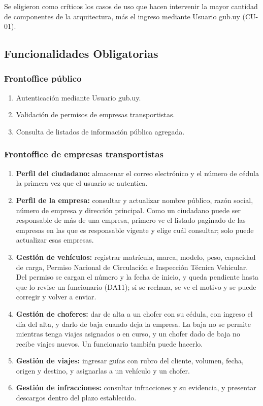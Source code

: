 Se eligieron como críticos los casos de uso que hacen intervenir la mayor cantidad de componentes de la arquitectura, más el ingreso mediante Usuario gub.uy (CU-01).

\FloatBarrier

\subsection{Funcionalidades Obligatorias}

\subsubsection{Frontoffice público}

\begin{enumerate}
    \item Autenticación mediante Usuario gub.uy.
    \item Validación de permisos de empresas transportistas.
    \item Consulta de listados de información pública agregada.
\end{enumerate}

\subsubsection{Frontoffice de empresas transportistas}

\begin{enumerate}
    \item \textbf{Perfil del ciudadano:} almacenar el correo electrónico y el número de cédula la primera vez que el usuario se autentica.
    \item \textbf{Perfil de la empresa:} consultar y actualizar nombre público, razón social, número de empresa y dirección principal. Como un ciudadano puede ser responsable de más de una empresa, primero ve el listado paginado de las empresas en las que es responsable vigente y elige cuál consultar; solo puede actualizar esas empresas.
    \item \textbf{Gestión de vehículos:} registrar matrícula, marca, modelo, peso, capacidad de carga, Permiso Nacional de Circulación e Inspección Técnica Vehicular. Del permiso se cargan el número y la fecha de inicio, y queda pendiente hasta que lo revise un funcionario (DA11); si se rechaza, se ve el motivo y se puede corregir y volver a enviar.
    \item \textbf{Gestión de choferes:} dar de alta a un chofer con su cédula, con ingreso el día del alta, y darlo de baja cuando deja la empresa. La baja no se permite mientras tenga viajes asignados o en curso, y un chofer dado de baja no recibe viajes nuevos. Un funcionario también puede hacerlo.
    \item \textbf{Gestión de viajes:} ingresar guías con rubro del cliente, volumen, fecha, origen y destino, y asignarlas a un vehículo y un chofer.
    \item \textbf{Gestión de infracciones:} consultar infracciones y su evidencia, y presentar descargos dentro del plazo establecido.
\end{enumerate}

